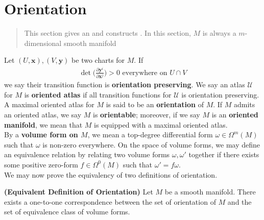 \documentclass{report}
\begin{document}
\section{Orientation}
\begin{abstract}
  This section gives an  and constructs . In this section, $M$ is always a $m$-dimensional smooth manifold  
\end{abstract}
\begin{mdframed}
Let $(U,\textbf{x}),(V,\textbf{y})$ be two charts for $M$. If 
\begin{align*}
  \operatorname{det} \Big(\frac{\partial \textbf{y}^i}{\partial \textbf{x}^j} \Big)>0\text{ everywhere on }U \cap V
\end{align*}
we say their transition function is \textbf{orientation preserving}. We say an atlas $\mathcal{U}$ for  $M$ is  \textbf{oriented atlas} if all transition functions for $\mathcal{U}$ is orientation preserving. A maximal oriented atlas for $M$ is said to be an  \textbf{orientation} of $M$. If $M$ admits an oriented atlas, we say  $M$ is  \textbf{orientable}; moreover, if we say $M$ is an  \textbf{oriented manifold}, we mean that $M$ is equipped with a maximal oriented atlas.\\

By a \textbf{volume form on $M$}, we mean a top-degree differential form $\omega \in \Omega^m(M)$ such that $\omega$ is non-zero everywhere. On the space of volume forms, we may define an equivalence relation by relating two volume forms $\omega,\omega'$ together if there exists some positive zero-form $f\in \Omega^0(M)$ such that  $\omega'=f \omega$.\\


We may now prove the equivalency of two definitions of orientation.  
\end{mdframed}
\begin{theorem}
\label{EDO}
\textbf{(Equivalent Definition of Orientation)} Let $M$ be a smooth manifold. There exists a one-to-one correspondence between the set of orientation of $M$ and the set of equivalence class of volume forms. 
\end{theorem}
\end{document}
